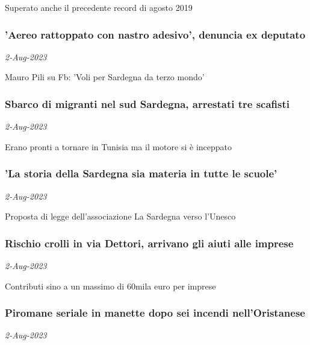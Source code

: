 Superato anche il precedente record di agosto 2019
\subsubsection{'Aereo rattoppato con nastro adesivo', denuncia ex deputato \href{https://www.ansa.it/sardegna/notizie/2023/08/02/aereo-rattoppato-con-nastro-adesivo-denuncia-ex-deputato_69df9e98-bcc8-45df-a9d5-3a20739aa7ac.html}{}}
\textit{2-Aug-2023}

Mauro Pili su Fb: 'Voli per Sardegna da terzo mondo'
\subsubsection{Sbarco di migranti nel sud Sardegna, arrestati tre scafisti \href{https://www.ansa.it/sardegna/notizie/2023/08/02/sbarco-di-migranti-nel-sud-sardegna-arrestati-tre-scafisti_649a2a97-2a8a-49c7-824f-2467eb01db17.html}{}}
\textit{2-Aug-2023}

Erano pronti a tornare in Tunisia ma il motore si \`{e} inceppato
\subsubsection{'La storia della Sardegna sia materia in tutte le scuole' \href{https://www.ansa.it/sardegna/notizie/2023/08/02/la-storia-della-sardegna-sia-materia-in-tutte-le-scuole_19295728-a517-44da-be70-00d9634c655f.html}{}}
\textit{2-Aug-2023}

Proposta di legge dell'associazione La Sardegna verso l'Unesco
\subsubsection{Rischio crolli in via Dettori, arrivano gli aiuti alle imprese \href{https://www.ansa.it/sardegna/notizie/2023/08/02/rischio-crolli-in-via-dettori-arrivano-gli-aiuti-alle-imprese_c2e77daa-cf25-43dc-90c2-ebe5dd495e76.html}{}}
\textit{2-Aug-2023}

Contributi sino a un massimo di 60mila euro per imprese
\subsubsection{Piromane seriale in manette dopo sei incendi nell'Oristanese \href{https://www.ansa.it/sardegna/notizie/2023/08/02/piromane-seriale-in-manette-dopo-sei-incendi-nelloristanese_ff6c4c7d-32f3-4263-bcad-e54769f0356b.html}{}}
\textit{2-Aug-2023}

